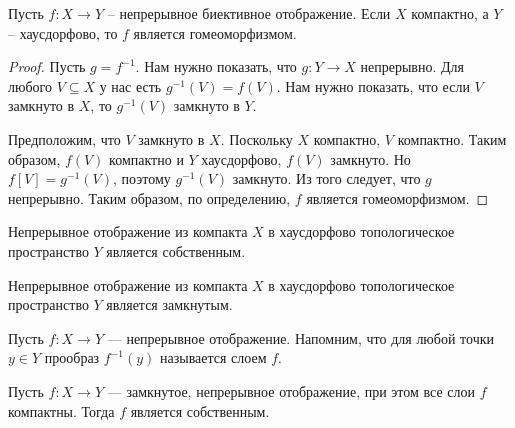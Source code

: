 \begin{statement}
	Пусть \( f : X \rightarrow Y \) -- непрерывное биективное отображение. Если \( X\) компактно, а \( Y \) -- хаусдорфово, то \( f \) является гомеоморфизмом.
\end{statement}
\begin{proof}
	Пусть \( g = f^{-1} \). Нам нужно показать, что \( g : Y \rightarrow X \) непрерывно. Для любого \( V \subseteq X \) у нас есть \( g^{-1}(V) = f(V) \). Нам нужно показать, что если \( V \) замкнуто в \( X \), то \( g^{-1}(V) \) замкнуто в \( Y \). 
	
	Предположим, что \( V \) замкнуто в \( X \). Поскольку \( X \) компактно, \( V \) компактно. Таким образом, \( f(V) \) компактно и \( Y \) хаусдорфово, \( f(V) \) замкнуто. Но \( f[V] = g^{-1}(V) \), поэтому \( g^{-1}(V) \) замкнуто. Из того следует, что \( g \) непрерывно. Таким образом, по определению, \( f \) является гомеоморфизмом.
\end{proof}

\begin{remark}
	Непрерывное отображение из компакта \( X \) в хаусдорфово топологическое пространство \( Y \) является собственным.
\end{remark}

\begin{corollary}
	Непрерывное отображение из компакта \( X \) в хаусдорфово топологическое пространство \( Y \) является замкнутым.
\end{corollary}

\begin{definition}
	Пусть \( f : X \to Y \) — непрерывное отображение. Напомним, что для любой точки \( y \in Y \) прообраз \( f^{-1}(y) \) называется слоем \( f \).
\end{definition}

\begin{theorem}
	Пусть \( f : X \to Y \) — замкнутое, непрерывное отображение, при этом все слои \( f \) компактны. Тогда \( f \) является собственным.
\end{theorem}

